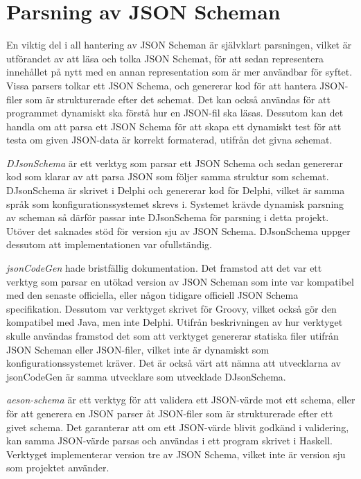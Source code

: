 \section{Parsning av JSON Scheman}

En viktig del i all hantering av JSON Scheman är självklart parsningen, vilket är utförandet av att läsa och tolka JSON Schemat, för att sedan representera innehållet på nytt med en annan representation som är mer användbar för syftet. Vissa parsers tolkar ett JSON Schema, och genererar kod för att hantera JSON-filer som är strukturerade efter det schemat. Det kan också användas för att programmet dynamiskt ska förstå hur en JSON-fil ska läsas. Dessutom kan det handla om att parsa ett JSON Schema för att skapa ett dynamiskt test för att testa om given JSON-data är korrekt formaterad, utifrån det givna schemat.

\textit{DJsonSchema} är ett verktyg som parsar ett JSON Schema och sedan genererar kod som klarar av att parsa JSON som följer samma struktur som schemat. DJsonSchema är skrivet i Delphi och genererar kod för Delphi, vilket är samma språk som konfigurationssystemet skrevs i. Systemet krävde dynamisk parsning av scheman så därför passar inte DJsonSchema för parsning i detta projekt. Utöver det saknades stöd för version sju av JSON Schema. DJsonSchema uppger dessutom att implementationen var ofullständig. \cite{Schlothauer&WauerGmbH}

\textit{jsonCodeGen} hade bristfällig dokumentation. Det framstod att det var ett verktyg som parsar en utökad version av JSON Scheman som inte var kompatibel med den senaste officiella, eller någon tidigare officiell JSON Schema specifikation. Dessutom var verktyget skrivet för Groovy, vilket också gör den kompatibel med Java, men inte Delphi. Utifrån beskrivningen av hur verktyget skulle användas framstod det som att verktyget genererar statiska filer utifrån JSON Scheman eller JSON-filer, vilket inte är dynamiskt som konfigurationssystemet kräver. Det är också värt att nämna att utvecklarna av jsonCodeGen är samma utvecklare som utvecklade DJsonSchema. \cite{Schlothauer&WauerGmbHa} 

\textit{aeson-schema} är ett verktyg för att validera ett JSON-värde mot ett schema, eller för att generera en JSON parser åt JSON-filer som är strukturerade efter ett givet schema. Det garanterar att om ett JSON-värde blivit godkänd i validering, kan samma JSON-värde parsas och användas i ett program skrivet i Haskell. Verktyget implementerar version tre av JSON Schema, vilket inte är version sju som projektet använder. \cite{Kowalczyk}

